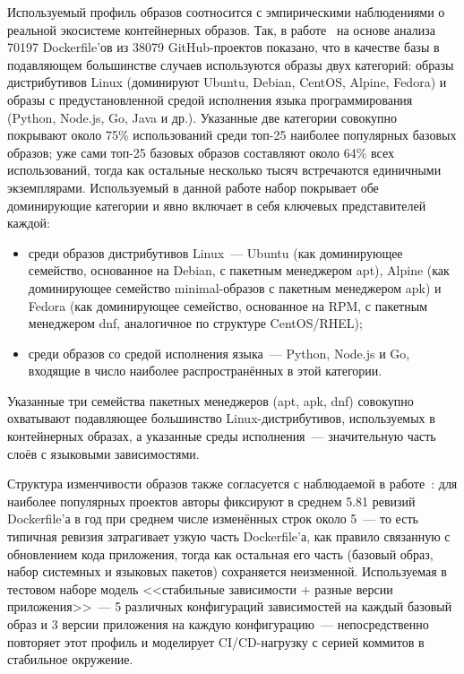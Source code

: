 Используемый профиль образов соотносится с эмпирическими наблюдениями о реальной экосистеме контейнерных образов. Так, в работе~\cite{cito2017empirical} на основе анализа 70197 Dockerfile'ов из 38079 GitHub-проектов показано, что в качестве базы в подавляющем большинстве случаев используются образы двух категорий: образы дистрибутивов Linux (доминируют Ubuntu, Debian, CentOS, Alpine, Fedora) и образы с предустановленной средой исполнения языка программирования (Python, Node.js, Go, Java и др.). Указанные две категории совокупно покрывают около 75\% использований среди топ-25 наиболее популярных базовых образов; уже сами топ-25 базовых образов составляют около 64\% всех использований, тогда как остальные несколько тысяч встречаются единичными экземплярами. Используемый в данной работе набор покрывает обе доминирующие категории и явно включает в себя ключевых представителей каждой:

\begin{itemize}
\item среди образов дистрибутивов Linux~--- Ubuntu (как доминирующее семейство, основанное на Debian, с пакетным менеджером apt), Alpine (как доминирующее семейство minimal-образов с пакетным менеджером apk) и Fedora (как доминирующее семейство, основанное на RPM, с пакетным менеджером dnf, аналогичное по структуре CentOS/RHEL);
\item среди образов со средой исполнения языка~--- Python, Node.js и Go, входящие в число наиболее распространённых в этой категории.
\end{itemize}

Указанные три семейства пакетных менеджеров (apt, apk, dnf) совокупно охватывают подавляющее большинство Linux-дистрибутивов, используемых в контейнерных образах, а указанные среды исполнения~--- значительную часть слоёв с языковыми зависимостями.

Структура изменчивости образов также согласуется с наблюдаемой в работе~\cite{cito2017empirical}: для наиболее популярных проектов авторы фиксируют в среднем 5.81 ревизий Dockerfile'а в год при среднем числе изменённых строк около 5~--- то есть типичная ревизия затрагивает узкую часть Dockerfile'а, как правило связанную с обновлением кода приложения, тогда как остальная его часть (базовый образ, набор системных и языковых пакетов) сохраняется неизменной. Используемая в тестовом наборе модель <<стабильные зависимости + разные версии приложения>>~--- 5 различных конфигураций зависимостей на каждый базовый образ и 3 версии приложения на каждую конфигурацию~--- непосредственно повторяет этот профиль и моделирует CI/CD-нагрузку с серией коммитов в стабильное окружение.


